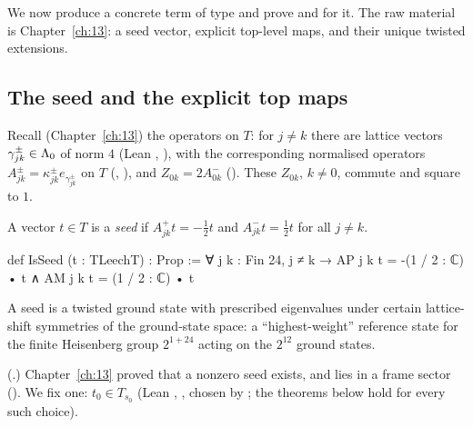 We now produce a concrete term of type  and prove  and  for
it.  The raw material is Chapter~\ref{ch:13}: a seed vector, explicit top-level maps, and their unique
twisted extensions.

\subsection{The seed and the explicit top maps}

Recall (Chapter~\ref{ch:13}) the operators on $T$: for $j\ne k$ there are lattice vectors
$\gamma^\pm_{jk}\in{\Lambda}_0$ of norm $4$ (Lean , ), with the corresponding
normalised operators $A^\pm_{jk}=\kappa^\pm_{jk}e_{\gamma^\pm_{jk}}$ on $T$ (, ), and
$Z_{0k}=2A^-_{0k}$ ().  These $Z_{0k}$, $k\ne0$, commute and square to $1$.

\begin{definition}[Seed]\label{ch14:def:seed}
A vector $t\in T$ is a \emph{seed} if $A^+_{jk}t=-\tfrac12t$ and $A^-_{jk}t=\tfrac12t$ for all $j\ne k$.
\end{definition}
\begin{leancode}
def IsSeed (t : TLeechT) : Prop :=
  ∀ j k : Fin 24, j ≠ k → AP j k t = -(1 / 2 : ℂ) • t ∧ AM j k t = (1 / 2 : ℂ) • t
\end{leancode}
\begin{physics}
A seed is a twisted ground state with prescribed eigenvalues under certain lattice-shift symmetries of the ground-state space: a ``highest-weight'' reference state for the finite Heisenberg group $2^{1+24}$ acting on the $2^{12}$ ground states.
\end{physics}

(.)  Chapter~\ref{ch:13} proved that a nonzero seed exists,
and lies in a frame sector ().  We fix one: $t_0\in T_{s_0}$
(Lean , , chosen by ; the theorems below hold for every such
choice).

